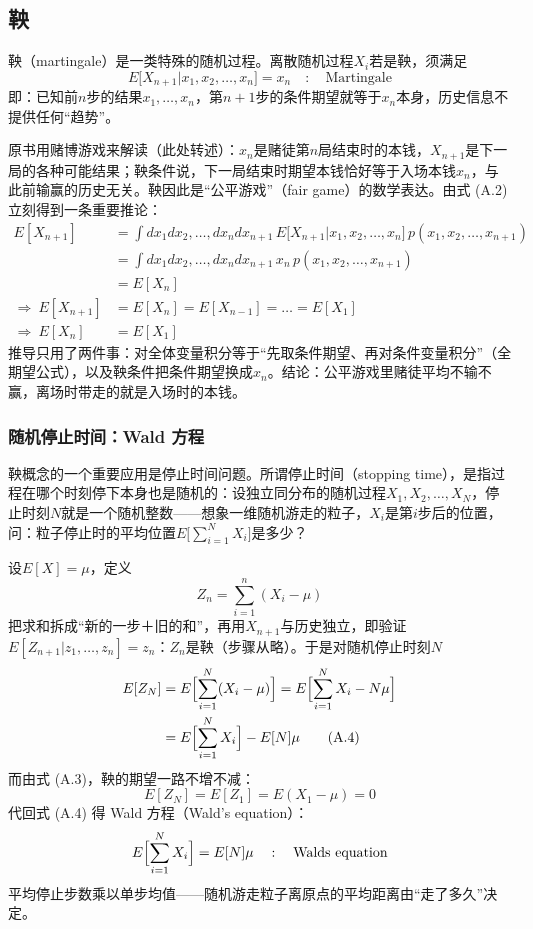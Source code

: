 \subsection{鞅}

鞅（martingale）是一类特殊的随机过程。离散随机过程$X_i$若是鞅，须满足
\begin{equation*}
E\bigl[X_{n+1}|x_1,x_2,\ldots,x_n\bigr]=x_n
\quad:\quad\text{Martingale}
\tag{A.2}
\end{equation*}
即：已知前$n$步的结果$x_1,\ldots,x_n$，第$n+1$步的条件期望就等于$x_n$本身，历史信息不提供任何“趋势”。

原书用赌博游戏来解读（此处转述）：$x_n$是赌徒第$n$局结束时的本钱，$X_{n+1}$是下一局的各种可能结果；鞅条件说，下一局结束时期望本钱恰好等于入场本钱$x_n$，与此前输赢的历史无关。鞅因此是“公平游戏”（fair game）的数学表达。由式 (A.2) 立刻得到一条重要推论：
\begin{align*}
E[X_{n+1}]
&=\int dx_1 dx_2,\ldots,dx_n dx_{n+1}\,
E\bigl[X_{n+1}|x_1,x_2,\ldots,x_n\bigr]\,
p(x_1,x_2,\ldots,x_{n+1})\\
&=\int dx_1 dx_2,\ldots,dx_n dx_{n+1}\,
x_n\,p(x_1,x_2,\ldots,x_{n+1})\\
&=E[X_n]\\
\Rightarrow\ E[X_{n+1}]&=E[X_n]=E[X_{n-1}]=\ldots=E[X_1]\\
\Rightarrow\ E[X_n]&=E[X_1]
\tag{A.3}
\end{align*}
推导只用了两件事：对全体变量积分等于“先取条件期望、再对条件变量积分”（全期望公式），以及鞅条件把条件期望换成$x_n$。结论：公平游戏里赌徒平均不输不赢，离场时带走的就是入场时的本钱。

\subsubsection*{随机停止时间：Wald 方程}

鞅概念的一个重要应用是停止时间问题。所谓停止时间（stopping time），是指过程在哪个时刻停下本身也是随机的：设独立同分布的随机过程$X_1,X_2,\ldots,X_N$，停止时刻$N$就是一个随机整数——想象一维随机游走的粒子，$X_i$是第$i$步后的位置，问：粒子停止时的平均位置$E\bigl[\sum_{i=1}^N X_i\bigr]$是多少？

设$E[X]=\mu$，定义
\begin{equation*}
Z_n=\sum_{i=1}^n (X_i-\mu)
\end{equation*}
把求和拆成“新的一步＋旧的和”，再用$X_{n+1}$与历史独立，即验证$E[Z_{n+1}|z_1,\ldots,z_n]=z_n$：$Z_n$是鞅（步骤从略）。于是对随机停止时刻$N$
\begin{align*}
E[Z_N]&=E\Bigl[\sum_{i=1}^N (X_i-\mu)\Bigr]
=E\Bigl[\sum_{i=1}^N X_i-N\mu\Bigr]\\
&=E\Bigl[\sum_{i=1}^N X_i\Bigr]-E[N]\mu
\tag{A.4}
\end{align*}
而由式 (A.3)，鞅的期望一路不增不减：
\begin{equation*}
E[Z_N]=E[Z_1]=E(X_1-\mu)=0
\end{equation*}
代回式 (A.4) 得 Wald 方程（Wald's equation）：
\begin{equation*}
E\Bigl[\sum_{i=1}^N X_i\Bigr]=E[N]\mu
\quad:\quad\text{Walds equation}
\end{equation*}
平均停止步数乘以单步均值——随机游走粒子离原点的平均距离由“走了多久”决定。

